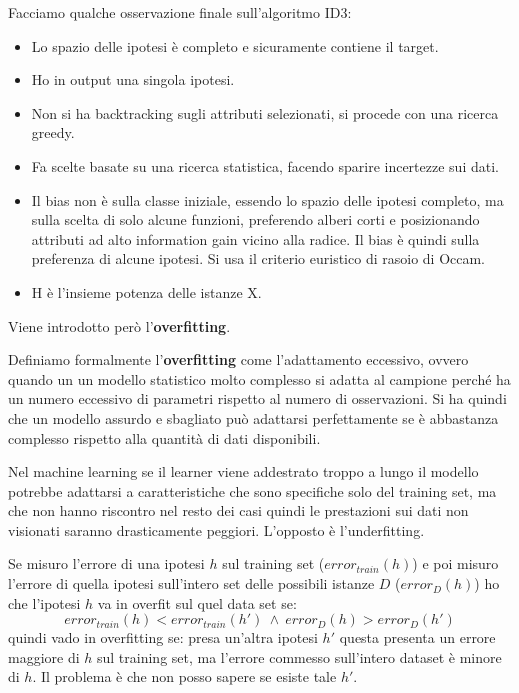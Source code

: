 Facciamo qualche osservazione finale sull'algoritmo ID3:
\begin{itemize}
    \item Lo spazio delle ipotesi è completo e sicuramente contiene il target.
    \item Ho in output una singola ipotesi.
    \item Non si ha backtracking sugli attributi selezionati, si procede con una
          ricerca greedy.
    \item Fa scelte basate su una ricerca statistica, facendo sparire incertezze
          sui dati.
    \item Il bias non è sulla classe iniziale, essendo lo spazio delle ipotesi
          completo, ma sulla scelta di solo alcune funzioni, preferendo alberi
          corti e posizionando attributi ad alto information gain vicino alla
          radice. Il bias è quindi sulla preferenza di alcune ipotesi. Si usa il
          criterio euristico di rasoio di Occam.
    \item H è l'insieme potenza delle istanze X.
\end{itemize}
Viene introdotto però l'\textbf{overfitting}.
\begin{definizione}
    Definiamo formalmente l'\textbf{overfitting} come l'adattamento eccessivo,
    ovvero quando un un modello statistico molto complesso si adatta al campione
    perché ha un numero eccessivo di parametri rispetto al numero di osservazioni.
    Si ha quindi che un modello assurdo e sbagliato può adattarsi perfettamente se
    è abbastanza complesso rispetto alla quantità di dati disponibili.

    Nel machine learning se il learner viene addestrato troppo a lungo il modello
    potrebbe adattarsi a caratteristiche che sono specifiche solo del training set,
    ma che non hanno riscontro nel resto dei casi quindi le prestazioni sui dati
    non visionati saranno drasticamente peggiori. L'opposto è l'underfitting.
\end{definizione}
Se misuro l'errore di una ipotesi $h$ sul training set ($error_{train}(h)$) e poi
misuro l'errore di quella ipotesi sull'intero set delle possibili istanze $D$
($error_D(h)$) ho che l'ipotesi $h$ va in overfit sul quel data set se:
\begin{equation}
    error_{train}(h) < error_{train}(h') \ \land \ error_D(h) > error_D(h')
\end{equation}
quindi vado in overfitting se: presa un'altra ipotesi $h'$ questa presenta un
errore maggiore di $h$ sul training set, ma l'errore commesso sull'intero dataset
è minore di $h$. Il problema è che non posso sapere se esiste tale $h'$.

